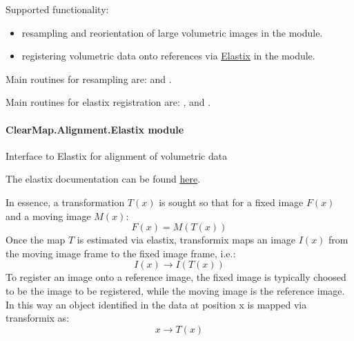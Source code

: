 \documentclass[letterpaper,10pt,english]{sphinxmanual}
\begin{document}
Supported functionality:
\begin{itemize}
\item {} 
resampling and reorientation of large volumetric images in the
{\hyperref[api/ClearMap.Alignment:module-ClearMap.Alignment.Resampling]{\emph{}}} module.

\item {} 
registering volumetric data onto references via
\href{http://elastix.isi.uu.nl/}{Elastix} in the
{\hyperref[api/ClearMap.Alignment:module-ClearMap.Alignment.Elastix]{\emph{}}} module.

\end{itemize}

Main routines for resampling are:
{\hyperref[api/ClearMap.Alignment:ClearMap.Alignment.Resampling.resampleData]{\emph{}}}
and {\hyperref[api/ClearMap.Alignment:ClearMap.Alignment.Resampling.resamplePoints]{\emph{}}}.

Main routines for elastix registration are:
{\hyperref[api/ClearMap.Alignment:ClearMap.Alignment.Elastix.alignData]{\emph{}}},
{\hyperref[api/ClearMap.Alignment:ClearMap.Alignment.Elastix.transformData]{\emph{}}} and
{\hyperref[api/ClearMap.Alignment:ClearMap.Alignment.Elastix.transformPoints]{\emph{}}}.


\paragraph{ClearMap.Alignment.Elastix module}
\label{api/ClearMap.Alignment:clearmap-alignment-elastix-module}\label{api/ClearMap.Alignment:module-ClearMap.Alignment.Elastix}
Interface to Elastix for alignment of volumetric data

The elastix documentation can be found \href{http://elastix.isi.uu.nl/}{here}.

In essence, a transformation $T(x)$ is sought so that for a fixed image
$F(x)$ and a moving image $M(x)$:
\begin{equation}F(x) = M(T(x))\end{equation}
Once the map $T$ is estimated via elastix, transformix maps an image
$I(x)$ from the moving image frame to the fixed image frame, i.e.:
\begin{equation}I(x) \rightarrow I(T(x))\end{equation}
To register an image onto a reference image, the fixed image is typically
choosed to be the image to be registered, while the moving image is the
reference image. In this way an object identified in the data at position x
is mapped via transformix as:
\begin{equation}x \rightarrow T(x)\end{equation}
\end{document}
